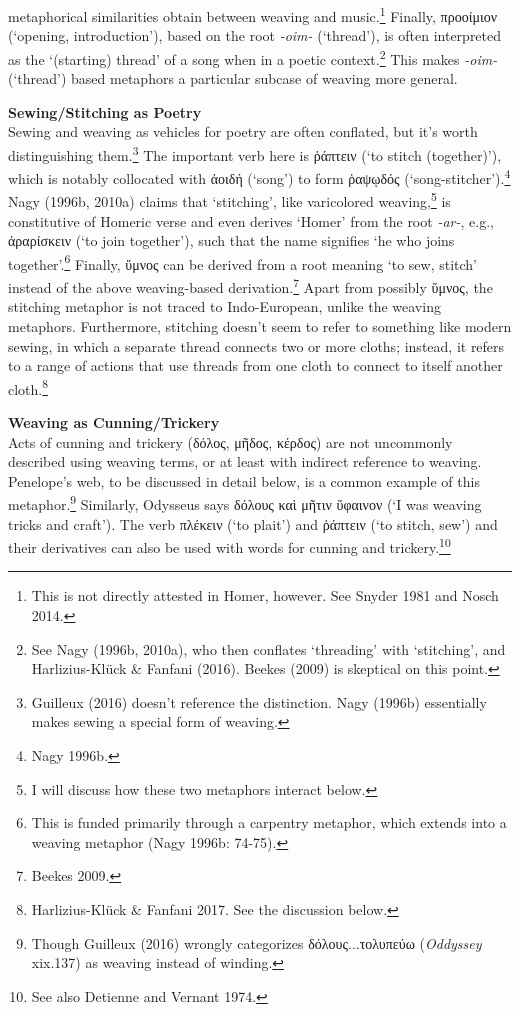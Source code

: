 \documentclass[12pt]{article}
\begin{document}
metaphorical similarities obtain between weaving and music.\footnote{ This is not directly attested in Homer, however. See Snyder 1981 and Nosch 2014.} Finally, προοίμιον (`opening, introduction'), based on the root \textit{-oim-} (`thread'), is often interpreted as the `(starting) thread' of a song when in a poetic context.\footnote{ See Nagy (1996b, 2010a), who then conflates `threading' with `stitching', and Harlizius-Kl\"{u}ck \& Fanfani (2016). Beekes (2009) is skeptical on this point.} This makes \textit{-oim-} (`thread') based metaphors a particular subcase of weaving more general.

\noindent \hfill \par
\noindent \textbf{Sewing/Stitching as Poetry} \\
Sewing and weaving as vehicles for poetry are often conflated, but it's worth distinguishing them.\footnote{ Guilleux (2016) doesn't reference the distinction. Nagy (1996b) essentially makes sewing a special form of weaving.} The important verb here is ῥάπτειν (`to stitch (together)'), which is notably collocated with ἀοιδή (`song') to form ῥαψῳδός (`song-stitcher').\footnote{ Nagy 1996b.} Nagy (1996b, 2010a) claims that `stitching', like varicolored weaving,\footnote{ I will discuss how these two metaphors interact below.} is constitutive of Homeric verse and even derives `Homer' from the root \textit{-ar-}, e.g., ἀραρίσκειν (`to join together'), such that the name signifies `he who joins together'.\footnote{ This is funded primarily through a carpentry metaphor, which extends into a weaving metaphor (Nagy 1996b: 74-75).} Finally, ὕμνος can be derived from a root meaning `to sew, stitch' instead of the above weaving-based derivation.\footnote{ Beekes 2009.} Apart from possibly ὕμνος, the stitching metaphor is not traced to Indo-European, unlike the weaving metaphors. Furthermore, stitching doesn't seem to refer to something like modern sewing, in which a separate thread connects two or more cloths; instead, it refers to a range of actions that use threads from one cloth to connect to itself another cloth.\footnote{ Harlizius-Kl\"{u}ck \& Fanfani 2017. See the discussion below.}

\noindent \hfill \par
\noindent \textbf{Weaving as Cunning/Trickery} \\
Acts of cunning and trickery (δόλος, μῆδος, κέρδος) are not uncommonly described using weaving terms, or at least with indirect reference to weaving. Penelope's web, to be discussed in detail below, is a common example of this metaphor.\footnote{ Though Guilleux (2016) wrongly categorizes δόλους...τολυπεύω (\textit{Oddyssey} xix.137) as weaving instead of winding.} Similarly, Odysseus says δόλους καὶ μῆτιν ὕφαινον (`I was weaving tricks and craft'). The verb πλέκειν (`to plait') and ῥάπτειν (`to stitch, sew') and their derivatives can also be used with words for cunning and trickery.\footnote{ See also Detienne and Vernant 1974.}
\end{document}

